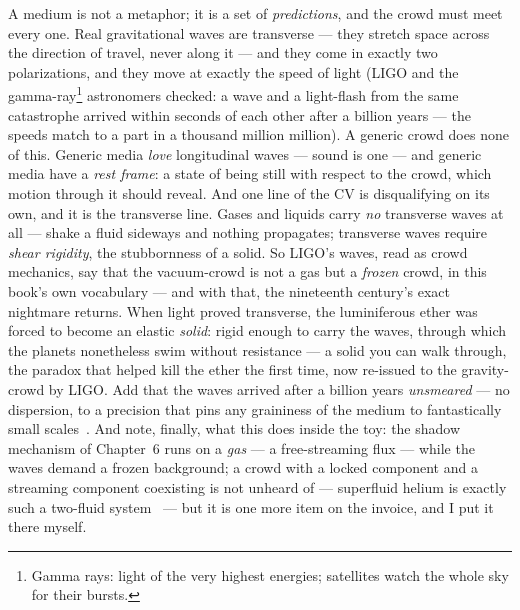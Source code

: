 \documentclass[fontsize=11pt,paper=a4,pagesize=auto,parskip=half-]{scrbook}
\begin{document}
A medium is not a metaphor; it is a set of \emph{predictions}, and the crowd must meet every one. Real gravitational waves are transverse --- they stretch space across the direction of travel, never along it --- and they come in exactly two polarizations, and they move at exactly the speed of light (LIGO and the gamma-ray\footnote{Gamma rays: light of the very highest energies; satellites watch the whole sky for their bursts.} astronomers checked: a wave and a light-flash from the same catastrophe arrived within seconds of each other after a billion years --- the speeds match to a part in a thousand million million). A generic crowd does none of this. Generic media \emph{love} longitudinal waves --- sound is one --- and generic media have a \emph{rest frame}: a state of being still with respect to the crowd, which motion through it should reveal. And one line of the CV is disqualifying on its own, and it is the transverse line. Gases and liquids carry \emph{no} transverse waves at all --- shake a fluid sideways and nothing propagates; transverse waves require \emph{shear rigidity}, the stubbornness of a solid. So LIGO's waves, read as crowd mechanics, say that the vacuum-crowd is not a gas but a \emph{frozen} crowd, in this book's own vocabulary --- and with that, the nineteenth century's exact nightmare returns. When light proved transverse, the luminiferous ether was forced to become an elastic \emph{solid}: rigid enough to carry the waves, through which the planets nonetheless swim without resistance --- a solid you can walk through, the paradox that helped kill the ether the first time, now re-issued to the gravity-crowd by LIGO. Add that the waves arrived after a billion years \emph{unsmeared} --- no dispersion, to a precision that pins any graininess of the medium to fantastically small scales~\cite{ligo2017graviton}. And note, finally, what this does inside the toy: the shadow mechanism of Chapter~6 runs on a \emph{gas} --- a free-streaming flux --- while the waves demand a frozen background; a crowd with a locked component and a streaming component coexisting is not unheard of --- superfluid helium is exactly such a two-fluid system~\cite{tisza1938,landau1941} --- but it is one more item on the invoice, and I put it there myself.
\end{document}
